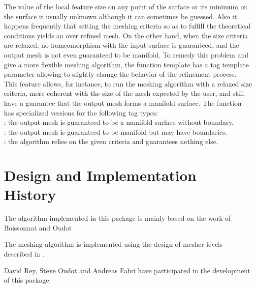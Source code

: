 The value of the local feature size on any point of the surface
or its minimum on the surface it usually unknown
although it can sometimes be guessed. Also it happens frequently
that setting the meshing criteria so as to fulfill the theoretical
conditions yields an over refined mesh.
On the other hand, when the size criteria are relaxed,
no homeomorphism with the input surface is guaranteed,
and the output mesh is not even guaranteed to be manifold.
To remedy this problem and give a more flexible
meshing algorithm, the function template
 has a tag template parameter
allowing to slightly change the behavior of the refinement process.
This feature allows, for instance,  to run the meshing
algorithm with a relaxed size criteria, more coherent
with the size of the mesh expected by the user,
and still have a guarantee that
the output mesh forms a manifold surface.
The function  has specialized versions
for the following  tag types: \\
: the output mesh is guaranteed to be a manifold
surface without boundary.\\
: the output mesh is guaranteed to be
manifold but may have boundaries.\\
: the algorithm relies on the given criteria and
guarantees nothing else.




\section{Design and Implementation History}

The algorithm implemented in this package
is mainly based on the  work of Boissonnat and Oudot
\cite{cgal:bo-pgsms-05}

The meshing algorithm is implemented using the design of mesher levels
described in \cite{cgal:ry-gsddrm-06}. 

David Rey, Steve Oudot and Andreas Fabri have participated
in the development of this package.




